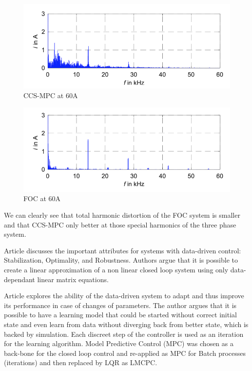 \documentclass[]{final_report}
\begin{document}
\begin{figure} [h!]
\centerline{\includegraphics[width=.75\textwidth]{Screenshots for related work/Asset p1/Asset p1p3.png}}
\caption{CCS-MPC at 60A
\cite{hanke2019continuous}}
\label{fig:p1p3}
\end{figure}

\begin{figure} [h!]
\centerline{\includegraphics[width=.75\textwidth]{Screenshots for related work/Asset p1/Asset p1p4.png}}
\caption{FOC at 60A
\cite{hanke2019continuous}}
\label{fig:p1p4}
\end{figure}

We can clearly see that total harmonic distortion of the FOC system is smaller and that CCS-MPC only better at those special harmonics of the three phase system.

Article \cite{de2019a} discusses the important attributes for systems with data-driven control: Stabilization, Optimality, and Robustness. Authors argue that it is possible to create a linear approximation of a non linear closed loop system using only data-dependant linear matrix equations. 

Article \cite{rosolia2018a} explores the ability of the data-driven system to adapt and thus improve its performance in case of changes of parameters. The author argues that it is possible to have a learning model that could be started without correct initial state and even learn from data without diverging back from better state, which is backed by simulation. Each discreet step of the controller is used as an iteration for the learning algorithm. Model Predictive Control (MPC) was chosen as a back-bone for the closed loop control and re-applied as MPC for Batch processes (iterations) and then replaced by LQR as LMCPC. 
\end{document}
